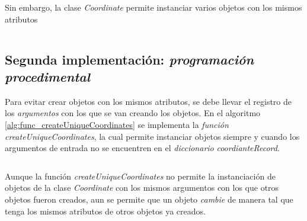 \documentclass{article}
\newenvironment{code}{\captionsetup{type=listing}}{}
\begin{document}
	Sin embargo, la clase \emph{Coordinate} permite instanciar varios objetos con los mismos atributos
	\inputminted[firstline=7, lastline=9]{python}{coordinate.py}

	\subsection{Segunda implementación: \emph{programación procedimental}}

	Para evitar crear objetos con los mismos atributos, se debe llevar el registro de los \emph{argumentos} con los que se van creando los objetos. En el algoritmo \ref{alg:func_createUniqueCoordinates} se implementa la \emph{función} \emph{createUniqueCoordinates}, la cual permite instanciar objetos siempre y cuando los argumentos de entrada no se encuentren en el \emph{diccionario} \emph{coordianteRecord}.
	\begin{code}
		\inputminted[firstline=10, lastline=23]{python}{coordinate.py}
		\label{alg:func_createUniqueCoordinates}
	\end{code}
	

	

	Aunque la función \emph{createUniqueCoordinates} no permite la instanciación de objetos de la clase \emph{Coordinate} con los mismos argumentos con los que otros objetos fueron creados, aun se permite que un objeto \emph{cambie} de manera tal que tenga los mismos atributos de otros objetos ya creados.
	\inputminted[firstline=25, lastline=27]{python}{coordinate.py}
\end{document}
